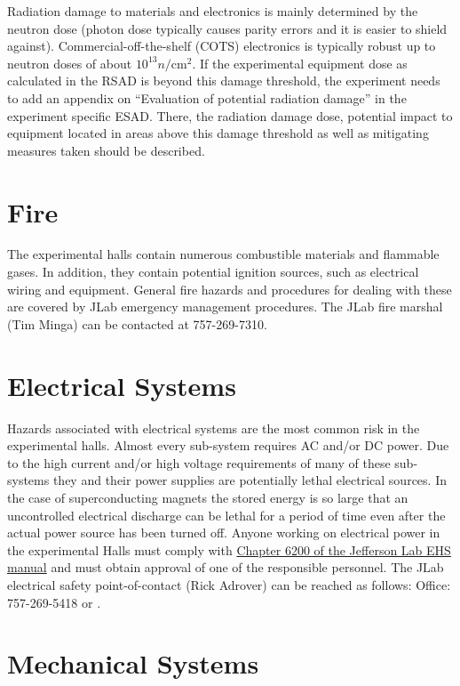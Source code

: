 Radiation damage to materials and electronics is mainly determined by the neutron 
dose (photon dose typically causes parity errors and it is easier to shield against). 
Commercial-off-the-shelf (COTS) electronics is typically robust up to neutron 
doses of about $10^{13} n/\textrm{cm}^2$. If the experimental equipment dose as calculated 
in the RSAD is beyond this damage threshold, the experiment needs to add 
an appendix on ``Evaluation of potential radiation damage'' in the experiment 
specific ESAD. There, the radiation damage dose, potential impact to equipment 
located in areas above this damage threshold as well as mitigating measures taken should be described.

\section{Fire}

	The experimental halls contain numerous combustible materials and flammable gases. 
In addition, they contain potential ignition sources, such as electrical wiring and equipment. 
General fire hazards and procedures for dealing with these are covered by JLab emergency 
management procedures. The JLab fire marshal (Tim Minga) can be contacted at 757-269-7310. %

\section{Electrical Systems}

	Hazards associated with electrical systems are the most common risk in the experimental halls. 
Almost every sub-system requires AC and/or DC power. Due to the high current and/or high voltage 
requirements of many of these sub-systems they and their power supplies are potentially lethal 
electrical sources. In the case of superconducting magnets the stored energy is so large that 
an uncontrolled electrical discharge can be lethal for a period of time even after the actual 
power source has been turned off.  Anyone working on electrical power in the experimental Halls 
must comply with \href{http://www.jlab.org/ehs/ehsmanual/manual/6200.html}{Chapter 6200 of the Jefferson Lab EHS manual}
and must obtain approval of one of the responsible personnel. 
The JLab electrical safety point-of-contact (Rick Adrover) can be reached as follows: Office: 757-269-5418 or .

\section{Mechanical Systems}

